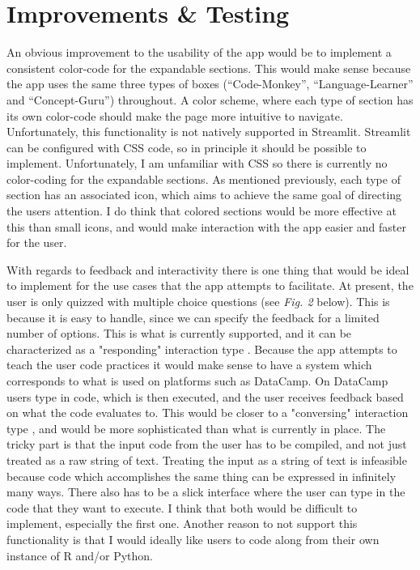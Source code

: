 \documentclass[12pt]{article}
\begin{document}
\section{Improvements \& Testing}
An obvious improvement to the usability of the app would be to implement a consistent
color-code for the expandable sections. This would make sense
because the app uses the same three types of boxes (“Code-Monkey”, “Language-Learner” and “Concept-Guru”)
throughout. A color scheme, where each type of section has its own color-code
should make the page more intuitive to navigate. Unfortunately, this functionality
is not natively supported in Streamlit. Streamlit can be configured with CSS code,
so in principle it should be possible to implement. Unfortunately, I am unfamiliar
with CSS so there is currently no color-coding for the expandable sections.
As mentioned previously, each type of section has an associated icon,
which aims to achieve the same goal of directing the users attention.
I do think that colored sections would be more effective at this than small icons,
and would make interaction with the app easier and faster for the user.

\vspace{5mm}

With regards to feedback and interactivity there is one thing that would be ideal
to implement for the use cases that the app attempts to facilitate. At present,
the user is only quizzed with multiple choice questions (see \emph{Fig. 2}
below). This is because it is easy
to handle, since we can specify the feedback for a limited number of options.
This is what is currently supported, and it can be characterized as a
"responding" interaction type \autocite[81]{rogers2011interaction}.
Because the app attempts to teach the user code practices it would make sense to
have a system which corresponds to what is used on platforms such as DataCamp.
On DataCamp users type in code, which is then executed, and the user receives feedback
based on what the code evaluates to. This would be closer to a "conversing"
interaction type \autocite[81]{rogers2011interaction},
and would be more sophisticated than what is currently in
place. The tricky part is that the input code from the user has to be
compiled,
and not just treated as a raw string of text. Treating the input as a string
of text is infeasible because code which accomplishes the same thing can be
expressed in infinitely many ways.
There also has to be a slick interface where the user can type in the code that
they want to execute. I think that both would be difficult to implement, especially the
first one. Another reason to not support this functionality is that I would ideally
like users to code along from their own instance of R and/or Python.
\end{document}
